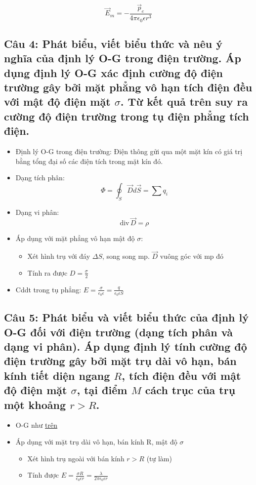 \begin{equation*}
  \vec{E}_m = - \frac{\vec{p}_e}{4\pi\epsilon_0\epsilon r^3}
\end{equation*}

\subsection[Câu 4]{Câu 4: Phát biểu, viết biểu thức và nêu ý nghĩa của định lý O-G trong điện trường. Áp dụng định lý O-G xác định cường độ điện trường gây bởi mặt phẳng vô hạn tích điện đều với mật độ điện mặt $\sigma$. Từ kết quả trên suy ra cường độ điện trường trong tụ điện phẳng tích điện.}\label{def:o-g}

\begin{itemize}
  \item Định lý O-G trong điện trường: Điện thông gửi qua một mặt kín có giá trị bằng tổng đại số các điện tích trong mặt kín đó.
  \item Dạng tích phân: $$\Phi = \oint_S \vec{D}d\vec{S} = \sum\limits q_i$$
  \item Dạng vi phân: $$\text{div}\,\vec{D} = \rho$$
  \item Áp dụng với mặt phẳng vô hạn mật độ $\sigma$:
  \begin{itemize}
    \item Xét hình trụ với đáy $\Delta S$, song song mp. $\vec{D}$ vuông góc với mp đó
    \item Tính ra được $D = \frac{\sigma}{2}$
  \end{itemize}
  \item Cddt trong tụ phẳng: $E = \frac{\sigma}{\epsilon_0\epsilon} = \frac{q}{\epsilon_0\epsilon S}$
\end{itemize}

\subsection[Câu 5]{Câu 5: Phát biểu và viết biểu thức của định lý O-G đối với điện trường (dạng tích phân và dạng vi phân). Áp dụng định lý tính cường độ điện trường gây bởi mặt trụ dài vô hạn, bán kính tiết diện ngang $R$, tích điện đều với mật độ điện mặt $\sigma$, tại điểm $M$ cách trục của trụ một khoảng $r>R$.}

\begin{itemize}
  \item O-G như \hyperref[def:o-g]{trên}
  \item Áp dụng với mặt trụ dài vô hạn, bán kính R, mật độ $\sigma$
  \begin{itemize}
    \item Xét hình trụ ngoài với bán kính $r > R$ (tự làm)
    \item Tính được $E = \frac{\sigma R}{\epsilon_0 \epsilon r} = \frac{\lambda}{2\pi\epsilon_0\epsilon r}$
  \end{itemize}
\end{itemize}

